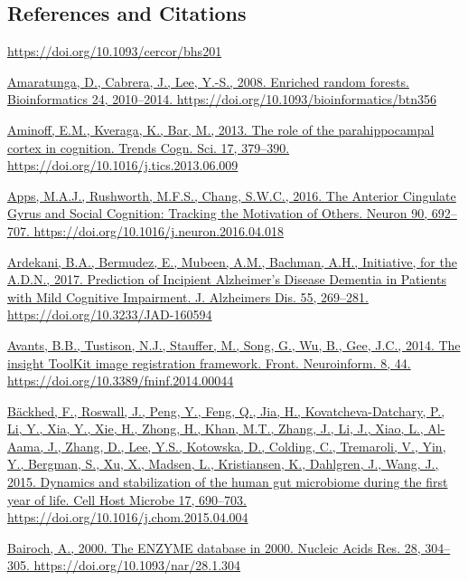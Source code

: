 \documentclass[
]{article}
\begin{document}
\hypertarget{references-and-citations}{%
\subsection{References and Citations}\label{references-and-citations}}

\url{https://doi.org/10.1093/cercor/bhs201}

\href{https://www.zotero.org/google-docs/?uydJ8e}{Amaratunga, D.,
Cabrera, J., Lee, Y.-S., 2008. Enriched random forests. Bioinformatics
24, 2010--2014. https://doi.org/10.1093/bioinformatics/btn356}

\href{https://www.zotero.org/google-docs/?uydJ8e}{Aminoff, E.M.,
Kveraga, K., Bar, M., 2013. The role of the parahippocampal cortex in
cognition. Trends Cogn. Sci. 17, 379--390.
https://doi.org/10.1016/j.tics.2013.06.009}

\href{https://www.zotero.org/google-docs/?uydJ8e}{Apps, M.A.J.,
Rushworth, M.F.S., Chang, S.W.C., 2016. The Anterior Cingulate Gyrus and
Social Cognition: Tracking the Motivation of Others. Neuron 90,
692--707. https://doi.org/10.1016/j.neuron.2016.04.018}

\href{https://www.zotero.org/google-docs/?uydJ8e}{Ardekani, B.A.,
Bermudez, E., Mubeen, A.M., Bachman, A.H., Initiative, for the A.D.N.,
2017. Prediction of Incipient Alzheimer's Disease Dementia in Patients
with Mild Cognitive Impairment. J. Alzheimers Dis. 55, 269--281.
https://doi.org/10.3233/JAD-160594}

\href{https://www.zotero.org/google-docs/?uydJ8e}{Avants, B.B.,
Tustison, N.J., Stauffer, M., Song, G., Wu, B., Gee, J.C., 2014. The
insight ToolKit image registration framework. Front. Neuroinform. 8, 44.
https://doi.org/10.3389/fninf.2014.00044}

\href{https://www.zotero.org/google-docs/?uydJ8e}{Bäckhed, F., Roswall,
J., Peng, Y., Feng, Q., Jia, H., Kovatcheva-Datchary, P., Li, Y., Xia,
Y., Xie, H., Zhong, H., Khan, M.T., Zhang, J., Li, J., Xiao, L.,
Al-Aama, J., Zhang, D., Lee, Y.S., Kotowska, D., Colding, C., Tremaroli,
V., Yin, Y., Bergman, S., Xu, X., Madsen, L., Kristiansen, K., Dahlgren,
J., Wang, J., 2015. Dynamics and stabilization of the human gut
microbiome during the first year of life. Cell Host Microbe 17,
690--703. https://doi.org/10.1016/j.chom.2015.04.004}

\href{https://www.zotero.org/google-docs/?uydJ8e}{Bairoch, A., 2000. The
ENZYME database in 2000. Nucleic Acids Res. 28, 304--305.
https://doi.org/10.1093/nar/28.1.304}
\end{document}
